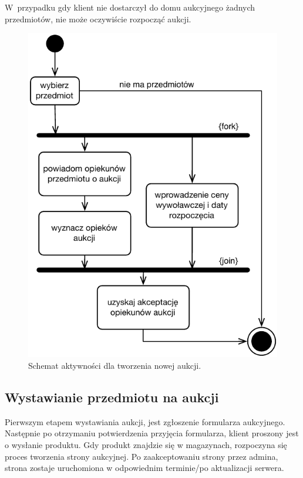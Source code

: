 \documentclass[10pt,a4paper]{article}
\begin{document}
W~przypadku gdy klient nie dostarczył do domu aukcyjnego żadnych przedmiotów,
nie może oczywiście rozpocząć aukcji.

\vspace{40pt}
\begin{figure}[hb]
  \begin{adjustwidth}{-3cm}{-3cm}
    \centering
    \includegraphics{figury/aktywnosc-nowa-aukcja}
    \caption{Schemat aktywności dla tworzenia nowej aukcji.}
    \label{fig:aktywnosc_nowa_aukcja}
  \end{adjustwidth}
\end{figure}
\clearpage

\subsection{Wystawianie przedmiotu na aukcji}

Pierwszym etapem wystawiania aukcji, jest zgłoszenie formularza aukcyjnego.
Następnie po otrzymaniu potwierdzenia przyjęcia formularza, klient proszony
jest o wysłanie produktu. Gdy produkt znajdzie się w magazynach, rozpoczyna się
proces tworzenia strony aukcyjnej. Po zaakceptowaniu strony przez admina,
strona zostaje uruchomiona w odpowiednim terminie/po aktualizacji serwera.
\end{document}
